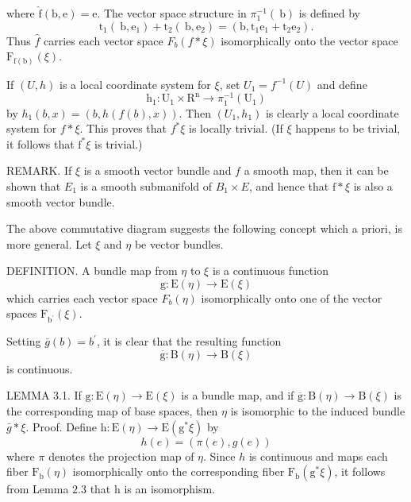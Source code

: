 \documentclass[10pt]{article}
\begin{document}
where $\hat{\mathrm{f}}(\mathrm{b}, \mathrm{e})=\mathrm{e}$. The vector space structure in $\pi_{1}^{-1}(\mathrm{~b})$ is defined by
$$
\mathrm{t}_{1}\left(\mathrm{~b}, \mathrm{e}_{1}\right)+\mathrm{t}_{2}\left(\mathrm{~b}, \mathrm{e}_{2}\right)=\left(\mathrm{b}, \mathrm{t}_{1} \mathrm{e}_{1}+\mathrm{t}_{2} \mathrm{e}_{2}\right) .
$$
Thus $\hat{f}$ carries each vector space $F_{b}(f * \xi)$ isomorphically onto the vector space $\mathrm{F}_{\mathrm{f}(\mathrm{b})}(\xi)$.

If $(U, h)$ is a local coordinate system for $\xi$, set $U_{1}=f^{-1}(U)$ and define
$$
\mathrm{h}_{1}: \mathrm{U}_{1} \times \mathrm{R}^{\mathrm{n}} \rightarrow \pi_{1}^{-1}\left(\mathrm{U}_{1}\right)
$$
by $h_{1}(b, x)=(b, h(f(b), x))$. Then $\left(U_{1}, h_{1}\right)$ is clearly a local coordinate system for $f * \xi$. This proves that $f^{*} \xi$ is locally trivial. (If $\xi$ happens to be trivial, it follows that $\mathrm{f}^{*} \xi$ is trivial.)

REMARK. If $\xi$ is a smooth vector bundle and $f$ a smooth map, then it can be shown that $E_{1}$ is a smooth submanifold of $B_{1} \times E$, and hence that $\mathrm{f} * \xi$ is also a smooth vector bundle.

The above commutative diagram suggests the following concept which a priori, is more general. Let $\xi$ and $\eta$ be vector bundles.

DEFINITION. A bundle map from $\eta$ to $\xi$ is a continuous function
$$
\mathrm{g}: \mathrm{E}(\eta) \rightarrow \mathrm{E}(\xi)
$$
which carries each vector space $F_{b}(\eta)$ isomorphically onto one of the vector spaces $\mathrm{F}_{\mathrm{b}^{\prime}}(\xi)$.

Setting $\bar{g}(b)=b^{\prime}$, it is clear that the resulting function
$$
\overline{\mathrm{g}}: \mathrm{B}(\eta) \rightarrow \mathrm{B}(\xi)
$$
is continuous.

LEMMA 3.1. If $\mathrm{g}: \mathrm{E}(\eta) \rightarrow \mathrm{E}(\xi)$ is a bundle map, and if $\overline{\mathrm{g}}: \mathrm{B}(\eta) \rightarrow \mathrm{B}(\xi)$ is the corresponding map of base spaces, then $\eta$ is isomorphic to the induced bundle $\bar{g} * \xi$. Proof. Define $\mathrm{h}: \mathrm{E}(\eta) \rightarrow \mathrm{E}\left(\mathrm{g}^{*} \xi\right)$ by
$$
h(e)=(\pi(e), g(e))
$$
where $\pi$ denotes the projection map of $\eta$. Since $h$ is continuous and maps each fiber $\mathrm{F}_{\mathrm{b}}(\eta)$ isomorphically onto the corresponding fiber $\mathrm{F}_{\mathrm{b}}\left(\mathrm{g}^{*} \xi\right)$, it follows from Lemma $2.3$ that $\mathrm{h}$ is an isomorphism.
\end{document}
